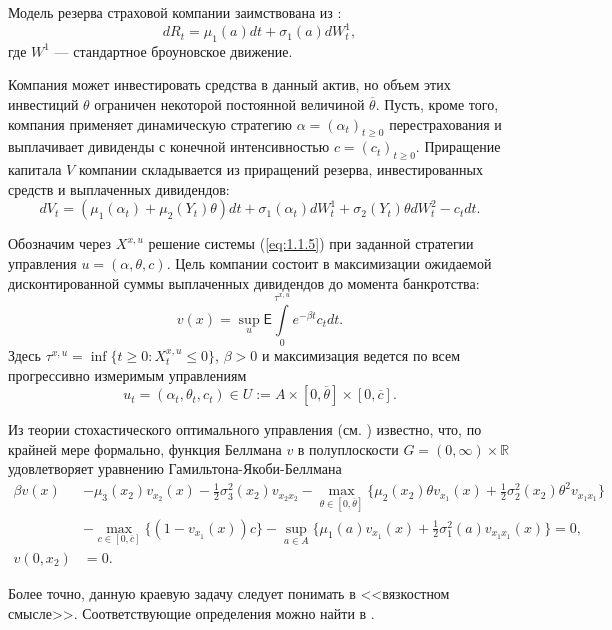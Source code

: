 Модель резерва страховой компании заимствована из \cite{AsmHojTak00, HogTak04}:
\begin{equation} \label{eq:1.1.1}
d R_t=\mu_1(a) dt+\sigma_1 (a) dW^1_t,
\end{equation}
где $W^1$ --- стандартное броуновское движение.

Компания может инвестировать средства в данный актив, но объем этих инвестиций $\theta$ ограничен некоторой постоянной величиной $\overline\theta$. Пусть, кроме того, компания применяет динамическую стратегию $\alpha=(\alpha_t)_{t\ge 0}$ перестрахования и выплачивает дивиденды с конечной интенсивностью $c=(c_t)_{t\ge 0}$.
Приращение капитала $V$ компании складывается из приращений резерва, инвестированных средств и выплаченных дивидендов:
\begin{equation} \label{eq:1.1.4}
dV_t=(\mu_1(\alpha_t)+\mu_2(Y_t) \theta)dt +\sigma_1(\alpha_t) d W_t^1+\sigma_2(Y_t) \theta d W_t^2-c_t dt.
\end{equation}

Обозначим через $X^{x,u}$ решение системы (\ref{eq:1.1.5}) при заданной стратегии управления $u=(\alpha,\theta,c)$. Цель компании состоит в максимизации ожидаемой дисконтированной суммы выплаченных дивидендов до момента банкротства:
\begin{equation} \label{eq:1.1.6}
v(x)=\sup_{u}\mathsf E \int\limits_{0}^{\tau^{x,u}} e^{-\beta t} c_t dt.
\end{equation}
Здесь $\tau^{x,u}=\inf\{t\ge 0: X_t^{x,u}\le 0\}$, $\beta>0$ и максимизация ведется по всем прогрессивно измеримым управлениям
$$ u_t=(\alpha_t,\theta_t,c_t)\in U:=A\times [0,\overline\theta]\times [0,\overline c].$$

Из теории стохастического оптимального управления (см. \cite{Kry77, Pha09, Tou13}) известно, что, по крайней мере формально, функция Беллмана $v$ в полуплоскости $G=(0,\infty)\times \mathbb R$ удовлетворяет уравнению Гамильтона-Якоби-Беллмана
\begin{align} \label{eq:1.2.1A}
\beta v(x) &-\mu_3(x_2) v_{x_2}(x)-\frac{1}{2}\sigma_3^2(x_2) v_{x_2 x_2}-\max_{\theta\in [0,\overline\theta]}\{\mu_2(x_2)\theta v_{x_1}(x)+\frac{1}{2}\sigma_2^2(x_2)\theta^2 v_{x_1 x_1}\}\nonumber\\
&- \max_{c\in [0,\overline c]}\{(1-v_{x_1}(x))c\}-\sup_{a\in A}\{\mu_1(a)v_{x_1}(x)+\frac{1}{2}\sigma_1^2(a)v_{x_1 x_1}(x)\}=0,\\
v(0,x_2) &=0.\nonumber
\end{align}

Более точно, данную краевую задачу следует понимать в <<вязкостном смысле>>. Соответствующие определения можно найти в \cite{CraIshLio92, Pha09, Tou13, Jak10}.


